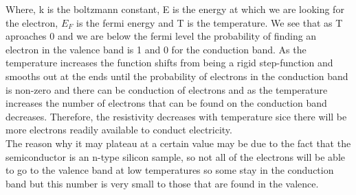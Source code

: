 \documentclass[twocolumn]{article}
\begin{document}
Where, k is the boltzmann constant, E is the energy at which we are looking 
for the electron, $E_{F}$ is the fermi energy and T is the temperature. We see 
that as T aproaches 0 and we are below the fermi level the probability of 
finding an electron in the valence band is 1 and 0 for the conduction band. As the 
temperature increases the function shifts from being a rigid step-function and 
smooths out at the ends until the probability of electrons in the conduction 
band is non-zero and there can be conduction of electrons and as the 
temperature increases the number of electrons that can be found on the 
conduction band decreases. Therefore, the resistivity decreases with 
temperature sice there will be more electrons readily available to conduct 
electricity.
\\
The reason why it may plateau at a certain value may be due to the fact that 
the semiconductor is an n-type silicon sample, so not all of the electrons will 
be able to go to 
the valence band at low temperatures so some stay in the conduction band but 
this number is very small to those that are found in the valence.
\end{document}
